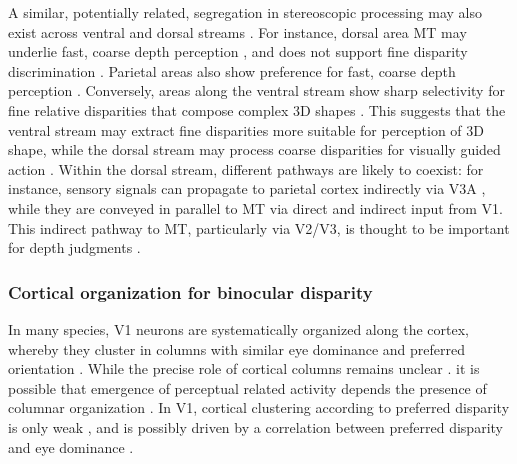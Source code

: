 A similar, potentially related, segregation in stereoscopic processing may also exist across ventral and dorsal streams \cite{Parker:2007nx}. For instance, dorsal area MT may underlie fast, coarse depth perception \cite{Uka:2003uq, Uka_2006}, and does not support fine disparity discrimination \cite{Uka_2006}. Parietal areas also show preference for fast, coarse depth perception \cite{Srivastava:2009oa}. Conversely, areas along the ventral stream show sharp selectivity for fine relative disparities that compose complex 3D shapes \cite{Watanabe:2002kx,Umeda:2007vn,Shiozaki:2012ys,Verhoef:2012dg,Janssen:2000oq,Janssen:2003fk}. This suggests that the ventral stream may extract fine disparities more suitable for perception of 3D shape, while the dorsal stream may process coarse disparities for visually guided action \cite{Parker:2007nx, Roe_Parker_Born_DeAngelis_2007}. Within the dorsal stream, different pathways are likely to coexist: for instance, sensory signals can propagate to parietal cortex indirectly via V3A \cite{Orban:2006kn}, while they are conveyed in parallel to MT via direct and indirect input from V1. This indirect pathway to MT, particularly via V2/V3, is thought to be important for depth judgments \cite{Ponce:2008km,Smolyanskaya:2015ve}.

\subsubsection{Cortical organization for binocular disparity}

In many species, V1 neurons are systematically organized along the cortex, whereby they cluster in columns with similar eye dominance and preferred orientation \cite{Hubel:1974sv,Wiesel:1974am,Hubel:1968hz,HUBEL:1962ti,Hubel:1978zt,Hubel:1969il}. While the precise role of cortical columns remains unclear \cite{Horton:2005hb}. it is possible that emergence of perceptual related activity depends the presence of columnar organization \cite{Nienborg:2014fu}. In V1, cortical clustering according to preferred disparity is only weak \cite{LeVay:1988ve,Prince:2002cr}, and is possibly driven by a correlation between preferred disparity and eye dominance \cite{Poggio:1977ys,LeVay:1988ve}.


